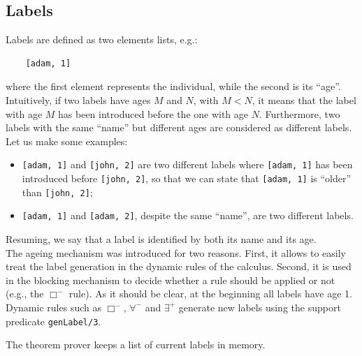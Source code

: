 \documentclass[a4paper, 11pt, oneside]{duthesis}
\newcommand{\perogni} {\forall}
\newcommand{\esiste} {\exists}
\begin{document}
\subsection{Labels}
Labels are defined as two elements lists, e.g.:
\begin{verbatim}
    [adam, 1]
\end{verbatim}
where the first element represents the individual, while the second is its ``age''.
Intuitively, if two labels have ages $M$ and $N$, with $M < N$, it means that the label with age $M$ has been introduced before the one with age $N$.
Furthermore, two labels with the same ``name'' but different ages are considered as different labels.\\

Let us make some examples:
\begin{itemize}
\item \texttt{[adam, 1]} and \texttt{[john, 2]} are two different labels where \texttt{[adam, 1]} has been introduced before \texttt{[john, 2]}, so that we can state that \texttt{[adam, 1]} is ``older'' than \texttt{[john, 2]};

\item \texttt{[adam, 1]} and \texttt{[adam, 2]}, despite the same ``name'', are two different labels.
\end{itemize}
Resuming, we say that a label is identified by both its name and its age.\\

The ageing mechanism was introduced for two reasons.
First, it allows to easily treat the label generation in the dynamic rules of the calculus.
Second, it is used in the blocking mechanism to decide whether a rule should be applied or not (e.g., the $\Box^-$ rule).
As it should be clear, at the beginning all labels have age 1. Dynamic rules such as $\Box^-$, $\perogni^-$ and $\esiste^+$ generate new labels using the support predicate \texttt{genLabel/3}.

The theorem prover keeps a list of current labels in memory.
\end{document}
